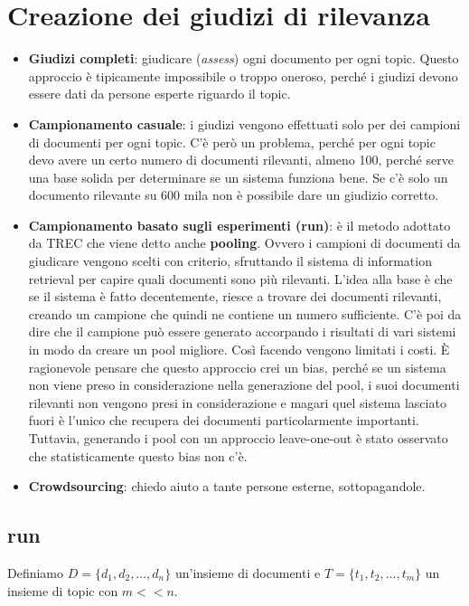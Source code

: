 \section{Creazione dei giudizi di rilevanza}

\begin{itemize}
	\item \textbf{Giudizi completi}: giudicare (\textit{assess}) ogni documento per ogni topic. Questo approccio è tipicamente impossibile o troppo oneroso, perché i giudizi devono essere dati da persone esperte riguardo il topic.
	\item \textbf{Campionamento casuale}: i giudizi vengono effettuati solo per dei campioni di documenti per ogni topic. C'è però un problema, perché per ogni topic devo avere un certo numero di documenti rilevanti, almeno 100, perché serve una base solida per determinare se un sistema funziona bene. Se c'è solo un documento rilevante su 600 mila non è possibile dare un giudizio corretto.
	\item \textbf{Campionamento basato sugli esperimenti (run)}: è il metodo adottato da TREC che viene detto anche \textbf{pooling}. Ovvero i campioni di documenti da giudicare vengono scelti con criterio, sfruttando il sistema di information retrieval per capire quali documenti sono più rilevanti.
	L'idea alla base è che se il sistema è fatto decentemente, riesce a trovare dei documenti rilevanti, creando un campione che quindi ne contiene un numero sufficiente.
	C'è poi da dire che il campione può essere generato accorpando i risultati di vari sistemi in modo da creare un pool migliore.
	Così facendo vengono limitati i costi.
	\`E ragionevole pensare che questo approccio crei un bias, perché se un sistema non viene preso in considerazione nella generazione del pool, i suoi documenti rilevanti non vengono presi in considerazione e magari quel sistema lasciato fuori è l'unico che recupera dei documenti particolarmente importanti.
	Tuttavia, generando i pool con un approccio leave-one-out è stato osservato che statisticamente questo bias non c'è.
	\item \textbf{Crowdsourcing}: chiedo aiuto a tante persone esterne, sottopagandole.
\end{itemize}

\subsection{run}

Definiamo $D = \{d_1, d_2, \ldots, d_n \}$ un'insieme di documenti e $T = \{ t_1, t_2, \ldots, t_m \}$ un insieme di topic con $m << n$.

